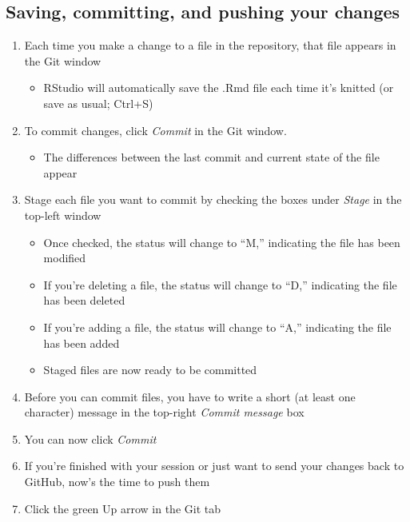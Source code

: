 \documentclass[12pt,]{article}
\providecommand{\tightlist}{%
  \setlength{\itemsep}{0pt}\setlength{\parskip}{0pt}}
\begin{document}
\subsection{Saving, committing, and pushing your
changes}\label{saving-committing-and-pushing-your-changes}

\begin{enumerate}
\def\labelenumi{\arabic{enumi}.}
\item
  Each time you make a change to a file in the repository, that file
  appears in the Git window

  \begin{itemize}
  \tightlist
  \item
    RStudio will automatically save the .Rmd file each time it's knitted
    (or save as usual; Ctrl+S)
  \end{itemize}
\item
  To commit changes, click \emph{Commit} in the Git window.

  \begin{itemize}
  \tightlist
  \item
    The differences between the last commit and current state of the
    file appear
  \end{itemize}
\item
  Stage each file you want to commit by checking the boxes under
  \emph{Stage} in the top-left window

  \begin{itemize}
  \tightlist
  \item
    Once checked, the status will change to ``M,'' indicating the file
    has been modified
  \item
    If you're deleting a file, the status will change to ``D,''
    indicating the file has been deleted
  \item
    If you're adding a file, the status will change to ``A,'' indicating
    the file has been added
  \item
    Staged files are now ready to be committed
  \end{itemize}
\item
  Before you can commit files, you have to write a short (at least one
  character) message in the top-right \emph{Commit message} box
\item
  You can now click \emph{Commit}
\item
  If you're finished with your session or just want to send your changes
  back to GitHub, now's the time to push them
\item
  Click the green Up arrow in the Git tab


\end{enumerate}
\end{document}
